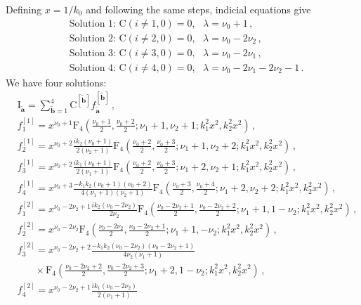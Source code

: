\documentclass[a4paper,11pt]{article}
\newcommand{\nn}{\nonumber}
\def\ie{\begin{equation}\begin{aligned}}
\def\fe{\end{aligned}\end{equation}}
\begin{document}
Defining $x=1/k_0$ and following the same steps, indicial equations give
\ie
&\text{Solution 1: }\text{C}(i\neq 1,0)= 0,~~~\lambda= \nu_0+1 \, ,\\
&\text{Solution 2: }\text{C}(i\neq 2,0)= 0,~~~\lambda= \nu_0-2\nu_2 \, ,\\
&\text{Solution 3: }\text{C}(i\neq 3,0)= 0,~~~\lambda= \nu_0-2 \nu_1 \, ,\\
&\text{Solution 4: }\text{C}(i\neq 4,0)= 0,~~~\lambda= \nu_0-2 \nu_1-2\nu_2-1 \, .
\fe
We have four solutions:
\begin{align}
&\text{I}_{\tilde{\bm{a}}}= \sum_{\tilde{\bm{b}}=1}^4 \text{C}^{[\tilde{\bm{b}}]}f_{\tilde{\bm{a}}}^{[\tilde{\bm{b}}]}\, , \nn\\
&f_{1}^{[1]}=x^{\nu _0+1} \text{F}_4\left(\frac{\nu _0+1}{2} ,\frac{\nu _0+2}{2};\nu _1+1,\nu
   _2+1;k_1^2 x^2,k_2^2 x^2\right) \, , \nn\\
&f_{2}^{[1]}=x^{\nu _0+2}\frac{i k_2 \left(\nu _0+1\right) }{2 \left(\nu _2+1\right)} 
\text{F}_4\left(\frac{\nu_0+2}{2},\frac{\nu _0+3}{2} ;\nu_1+1,\nu_2+2;k_1^2 x^2,k_2^2 x^2\right)\, , \nn\\
&f_{3}^{[1]}= x^{\nu _0+2}\frac{i k_1 \left(\nu _0+1\right)}{2 \left(\nu _1+1\right)}
\text{F}_4\left(\frac{\nu_0+2}{2},\frac{\nu_0+3}{2} ;\nu_1+2,\nu_2+1;k_1^2 x^2,k_2^2 x^2\right)  \, , \nn\\
&f_{4}^{[1]}=x^{\nu _0+3}\frac{-k_1 k_2 \left(\nu _0+1\right) \left(\nu _0+2\right) }{4 \left(\nu _1+1\right)\left(\nu _2+1\right)}
\text{F}_4\left(\frac{\nu _0+3}{2},\frac{\nu _0+4}{2};\nu_1+2,\nu_2+2;k_1^2 x^2,k_2^2 x^2\right)  \, , \nn\\
&f_{1}^{[2]}=x^{\nu _0-2 \nu _2+1}\frac{i k_2 \left(\nu _0-2 \nu_2\right) }{2 \nu_2}
\text{F}_4\left(\frac{\nu_0-2 \nu_2+1}{2},\frac{\nu_0-2\nu_2+2}{2};\nu_1+1,1-\nu_2;k_1^2 x^2,k_2^2 x^2\right) \, , \nn\\
&f_{2}^{[2]}=x^{\nu_0-2\nu_2}  
\text{F}_4\left(\frac{\nu_0-2 \nu_2}{2},\frac{\nu _0-2 \nu_2+1}{2} ;\nu _1+1,-\nu _2;k_1^2 x^2,k_2^2 x^2\right)  \, , \nn\\
&f_{3}^{[2]}= x^{\nu _0-2 \nu _2+2}\frac{ - k_1 k_2 \left(\nu _0-2 \nu _2\right) \left(\nu _0-2 \nu _2+1\right)}{4 \nu_2 \left(\nu _1+1\right)} \nn\\
&~~~~~~~~\times \text{F}_4\left(\frac{\nu_0-2 \nu_2+2}{2},\frac{\nu _0-2 \nu_2+3}{2} ;\nu _1+2,1-\nu _2;k_1^2 x^2,k_2^2 x^2\right)\, , \nn\\
&f_{4}^{[2]}=x^{\nu _0-2 \nu _2+1}\frac{i k_1 \left(\nu _0-2 \nu _2\right) }{2 \left(\nu_1+1\right)}

\end{align}
\end{document}
